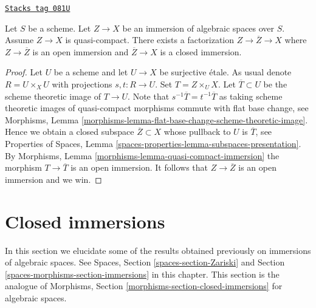 \begin{lemma}
\label{spaces-morphisms-lemma-factor-the-other-way}
\href{https://stacks.math.columbia.edu/tag/081U}{\texttt{Stacks tag 081U}}

Let $S$ be a scheme. Let $Z \to X$ be an immersion of algebraic spaces over
$S$. Assume $Z \to X$ is quasi-compact.
There exists a factorization $Z \to \overline{Z} \to X$ where
$Z \to \overline{Z}$ is an open immersion and $\overline{Z} \to X$
is a closed immersion.
\end{lemma}

\begin{proof}
Let $U$ be a scheme and let $U \to X$ be surjective \'etale.
As usual denote $R = U \times_X U$ with projections
$s, t : R \to U$. Set $T = Z \times_U X$. Let $\overline{T} \subset U$
be the scheme theoretic image of $T \to U$. Note that
$s^{-1}\overline{T} = t^{-1}\overline{T}$ as taking
scheme theoretic images of quasi-compact morphisms commute
with flat base change, see
Morphisms, Lemma \ref{morphisms-lemma-flat-base-change-scheme-theoretic-image}.
Hence we obtain a closed subspace $\overline{Z} \subset X$ whose
pullback to $U$ is $\overline{T}$, see
Properties of Spaces, Lemma
\ref{spaces-properties-lemma-subspaces-presentation}.
By Morphisms, Lemma \ref{morphisms-lemma-quasi-compact-immersion}
the morphism $T \to \overline{T}$
is an open immersion. It follows that $Z \to \overline{Z}$ is
an open immersion and we win.
\end{proof}

\section{Closed immersions}
\label{spaces-morphisms-section-closed-immersions}
In this section we elucidate some of the results obtained previously on
immersions of algebraic spaces. See
Spaces, Section \ref{spaces-section-Zariski}
and
Section \ref{spaces-morphisms-section-immersions} in this chapter.
This section is the analogue of
Morphisms, Section \ref{morphisms-section-closed-immersions}
for algebraic spaces.

